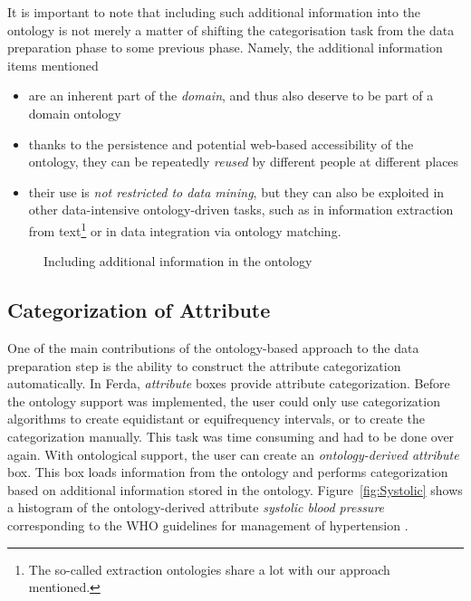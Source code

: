 It is important to note that including such additional information into the ontology is not merely a matter of shifting the categorisation task from the data preparation phase to some previous phase.
Namely, the additional information items mentioned
\begin{itemize}
	\item are an inherent part of the \emph{domain}, and thus also deserve to be part of a domain ontology
	\item thanks to the persistence and potential web-based accessibility of the ontology, they can be repeatedly \emph{reused} by different people at different places
	\item their use is \emph{not restricted to data mining}, but they can also be exploited in other data-intensive ontology-driven tasks, such as in information extraction from text\footnote{The so-called extraction ontologies \cite{Embley,Prickl} share a lot with our approach mentioned.} or in data integration via ontology matching.
\end{itemize}

\begin{figure}[ht]
\centering
\mbox{}
\caption{Including additional information in the ontology}
\label{fig:Protege}
\end{figure}

\subsection{Categorization of Attribute}
One of the main contributions of the ontology-based approach to the data preparation step is the ability to construct the attribute categorization automatically. 
In Ferda, \emph{attribute} boxes provide attribute categorization. 
Before the ontology support was implemented, the user could only use categorization algorithms to create equidistant or equifrequency intervals, or to create the categorization manually. 
This task was time consuming and had to be done over again. 
With ontological support, the user can create an \emph{ontology-derived attribute} box. 
This box loads information from the ontology and performs categorization based on additional information stored in the ontology. 
Figure~\ref{fig:Systolic} shows a histogram of the ontology-derived attribute \emph{systolic blood pressure} corresponding to the WHO guidelines for management of hypertension \cite{Hypertension}. 


